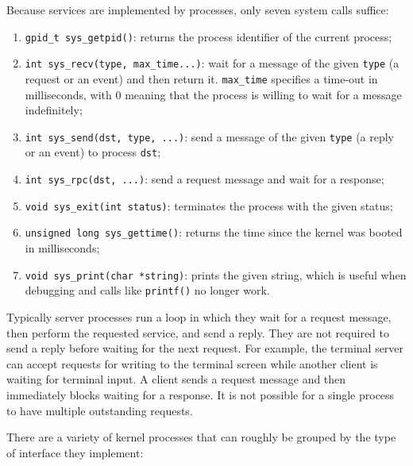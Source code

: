 \documentclass{article}
\begin{document}
Because services are implemented by processes, only seven system calls suffice:

\begin{enumerate}
\item \texttt{gpid\_t sys\_getpid()}: returns the process identifier
of the current process;
\item \texttt{int sys\_recv(type, max\_time...)}: wait for a message of the
given \texttt{type} (a request or an event) and then return it.
\texttt{max\_time} specifies a
time-out in milliseconds, with 0 meaning that the process is willing to
wait for a message indefinitely;
\item \texttt{int sys\_send(dst, type, ...)}: send a message of the
given \texttt{type} (a reply or an event) to process \texttt{dst};
\item \texttt{int sys\_rpc(dst, ...)}: send a request message and wait
for a response;
\item \texttt{void sys\_exit(int status)}: terminates the process with
the given status;
\item \texttt{unsigned long sys\_gettime()}: returns the time since the kernel was booted in milliseconds;
\item \texttt{void sys\_print(char *string)}: prints the given string, which
is useful when debugging and calls like \texttt{printf()} no longer work.
\end{enumerate}

Typically server processes run a loop in which they wait for a request
message, then perform the requested service, and send a reply.  They
are not required to send a reply before waiting for the next request.
For example, the terminal server can accept requests for writing to
the terminal screen while another client is waiting for terminal input.
A client sends a request message and then immediately blocks
waiting for a response.  It is not possible for a single process to have
multiple outstanding requests.

There are a variety of kernel processes that can roughly be grouped
by the type of interface they implement:
\end{document}
